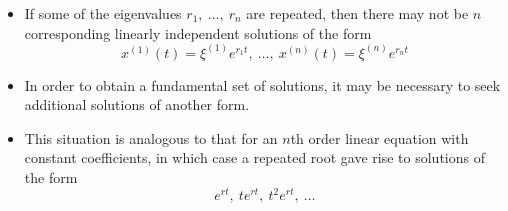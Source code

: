 \documentclass[11pt,a4paper]{article}
\begin{document}
	\begin{itemize}
		\item If some of the eigenvalues $r_1,\ \ldots,\ r_n$ are repeated, then there may not be $n$ corresponding linearly independent solutions of the form
		$$
		x^{(1)}(t) = \xi^{(1)}e^{r_1t},\ \ldots,\ x^{(n)}(t) = \xi^{(n)}e^{r_nt}
		$$
		\item In order to obtain a fundamental set of solutions, it may be necessary to seek additional solutions of another form.
		\item This situation is analogous to that for an $n$th order linear equation with constant coefficients, in which case a repeated root gave rise to solutions of the form
		$$
		e^{rt},\ te^{rt},\ t^2e^{rt},\ \ldots
		$$
	\end{itemize}
\end{document}
